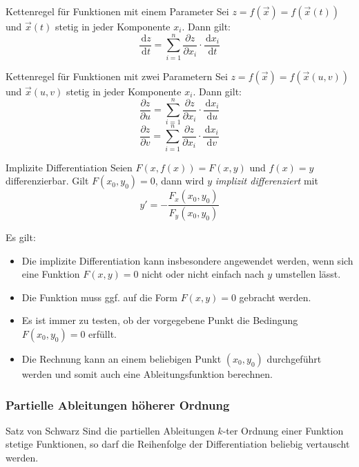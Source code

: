 \documentclass[german]{../spicker}
\renewcommand{\d}{\,\mathrm{d}}
\begin{document}
\begin{defi}{Kettenregel für Funktionen mit einem Parameter}
    Sei $z = f(\vec{x}) = f(\vec{x}(t))$ und $\vec{x}(t)$ stetig in jeder Komponente $x_i$. Dann gilt:
    $$
        \frac{\d z}{\d t} = \sum_{i=1}^n \frac{\partial z}{\partial x_i} \cdot \frac{\d x_i}{\d t}
    $$
\end{defi}

\begin{defi}{Kettenregel für Funktionen mit zwei Parametern}
    Sei $z = f(\vec{x}) = f(\vec{x}(u,v))$ und $\vec{x}(u,v)$ stetig in jeder Komponente $x_i$. Dann gilt:
    $$
        \frac{\partial z}{\partial u} = \sum_{i=1}^n \frac{\partial z}{\partial x_i} \cdot \frac{\d x_i}{\d u}
    $$
    $$
        \frac{\partial z}{\partial v} = \sum_{i=1}^n \frac{\partial z}{\partial x_i} \cdot \frac{\d x_i}{\d v}
    $$
\end{defi}

\begin{defi}{Implizite Differentiation}
    Seien $F(x, f(x)) = F(x, y)$ und $f(x) = y$ differenzierbar.
    Gilt $F(x_0, y_0) = 0$, dann wird $y$ \emph{implizit differenziert} mit
    $$
        y' = -\frac{F_x(x_0, y_0)}{F_y(x_0, y_0)}
    $$

    Es gilt:
    \begin{itemize}
        \item Die implizite Differentiation kann insbesondere angewendet werden, wenn sich eine Funktion $F(x, y)=0$ nicht oder nicht einfach nach $y$ umstellen lässt.
        \item Die Funktion muss ggf. auf die Form $F(x, y) = 0$ gebracht werden.
        \item Es ist immer zu testen, ob der vorgegebene Punkt die Bedingung $F(x_0, y_0) = 0$ erfüllt.
        \item Die Rechnung kann an einem beliebigen Punkt $(x_0, y_0)$ durchgeführt werden und somit auch eine Ableitungsfunktion berechnen.
    \end{itemize}
\end{defi}

\subsubsection{Partielle Ableitungen höherer Ordnung}

\begin{defi}{Satz von Schwarz}
    Sind die partiellen Ableitungen $k$-ter Ordnung einer Funktion stetige Funktionen, so darf die Reihenfolge der Differentiation beliebig vertauscht werden.
\end{defi}
\end{document}
